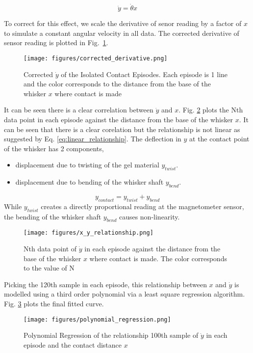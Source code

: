 \documentclass[runningheads]{llncs}
\begin{document}
\[\dot{y} = \dot{\theta}x\]\label{eq:linear_relationship}

To correct for this effect, we scale the derivative of senor reading by a factor of \(x\) to simulate a constant angular velocity in all data. The corrected derivative of sensor reading is plotted in Fig.~\ref{fig:corrected_derivative.png}.

\begin{figure}[H]
    \centering
    \texttt{[image: figures/corrected\_derivative.png]}
    \caption{Corrected \(\dot{y}\) of the Isolated Contact Episodes. Each episode is 1 line and the color corresponds to the distance from the base of the whisker \(x\) where contact is made}
    \label{fig:corrected_derivative.png}
\end{figure}

It can be seen there is a clear correlation between \(\dot{y}\) and \(x\). Fig. \ref*{fig:x_y_relationship.png} plots the Nth data point in each episode against the distance from the base of the whisker \(x\). It can be seen that there is a clear corelation but the relationship is not linear as suggested by Eq. \ref*{eq:linear_relationship}. The deflection in \(y\) at the contact point of the whisker has 2 components,
\begin{itemize}
    \item displacement due to twisting of the gel material \(y_{twist}\).
    \item displacement due to bending of the whisker shaft \(y_{bend}\).
\end{itemize}
\[y_{contact} = y_{twist} + y_{bend}\]
While \(y_{twist}\) creates a directly proportional reading at the magnetometer sensor, the bending of the whisker shaft \(y_{bend}\) causes non-linearity.

\begin{figure}[H]
    \centering
    \texttt{[image: figures/x\_y\_relationship.png]}
    \caption{Nth data point of \(\dot{y}\) in each episode against the distance from the base of the whisker \(x\) where contact is made. The color corresponds to the value of N}
    \label{fig:x_y_relationship.png}
\end{figure}


Picking the 120th sample in each episode, this relationship between \(x\) and \(\dot{y}\) is modelled using a third order polynomial via a least square regression algorithm. Fig. \ref*{fig:polynomial_regression.png} plots the final fitted curve.

\begin{figure}[H]
    \centering
    \texttt{[image: figures/polynomial\_regression.png]}
    \caption{Polynomial Regression of the relationship 100th sample of \(\dot{y}\) in each episode and the contact distance \(x\)}
    \label{fig:polynomial_regression.png}
\end{figure}
\end{document}
